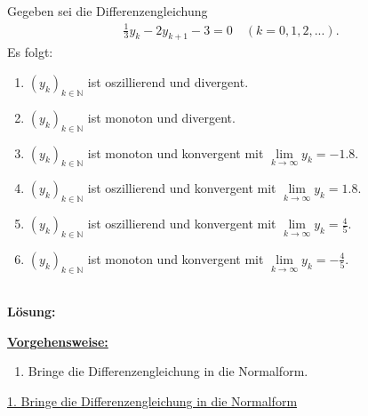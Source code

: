 \subsection*{}
Gegeben sei die Differenzengleichung
\begin{align*}
	\frac{1}{3} y_k
	-
	2 y_{k+1}
	-3
	=0
	\quad (k = 0,1,2,...).
\end{align*}
Es folgt:
\renewcommand{\labelenumi}{(\alph{enumi})}
\begin{enumerate}
	\item
	$ (y_k)_{k \in \mathbb{N}} $ ist oszillierend und divergent.
	\item
	$ (y_k)_{k \in \mathbb{N}} $ ist monoton und divergent.	
	\item 
	$ (y_k)_{k \in \mathbb{N}} $ ist monoton und konvergent mit $ \lim \limits_{k \to \infty} y_k = -1.8$.
	\item
	$ (y_k)_{k \in \mathbb{N}} $ ist oszillierend und konvergent mit $ \lim \limits_{k \to \infty} y_k = 1.8$.
	\item 
	$ (y_k)_{k \in \mathbb{N}} $ ist oszillierend und konvergent mit $ \lim \limits_{k \to \infty} y_k = \frac{4}{5}$.
	\item 
	$ (y_k)_{k \in \mathbb{N}} $ ist monoton und konvergent mit $ \lim \limits_{k \to \infty} y_k = -\frac{4}{5}$.
\end{enumerate}
\ \\
\textbf{Lösung:}
\begin{mdframed}
\underline{\textbf{Vorgehensweise:}}
\renewcommand{\labelenumi}{\theenumi.}
\begin{enumerate}
\item Bringe die Differenzengleichung in die Normalform.
\end{enumerate}
\end{mdframed}

\underline{1. Bringe die Differenzengleichung in die Normalform}\\

